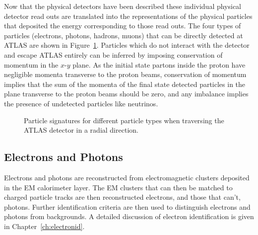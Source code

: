 
Now that the physical detectors have been described these individual physical detector read outs are translated into the representations of the physical particles that deposited the energy corresponding to those read outs. 
The four types of particles (electrons, photons, hadrons, muons) that can be directly detected at ATLAS are shown in Figure~\ref{fig:detector:objectreco}.
Particles which do not interact with the detector and escape ATLAS entirely can be inferred by imposing conservation of momentum in the $x$-$y$ plane.
As the initial state partons inside the proton have negligible momenta transverse to the proton beams, conservation of momentum implies that the sum of the momenta of the final state detected particles in the plane transverse to the proton beams should be zero, and any imbalance implies the presence of undetected particles like neutrinos.
\begin{figure}[h]
  \begin{center}
  \end{center}
  \caption[Particle signatures for different particle types when traversing the ATLAS detector.]
          {Particle signatures for different particle types when traversing the ATLAS detector in a radial direction.}
          \label{fig:detector:objectreco}
\end{figure}

\subsection{Electrons and Photons}
Electrons and photons are reconstructed from electromagnetic clusters deposited in the EM calorimeter layer.
The EM clusters that can then be matched to charged particle tracks are then reconstructed electrons, and those that can't, photons.
Further identification criteria are then used to distinguish electrons and photons from backgrounds.
A detailed discussion of electron identification is given in Chapter~\ref{ch:electronid}.

